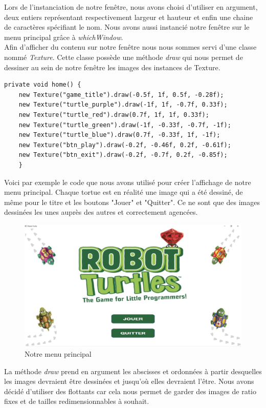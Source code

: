\documentclass{article}
\begin{document}
Lors de l'instanciation de notre fenêtre, nous avons choisi d'utiliser en argument, deux entiers représentant respectivement largeur et hauteur et enfin une chaine de caractères spécifiant le nom. Nous avons aussi instancié notre fenêtre sur le menu principal grâce à \textit{whichWindow}. \\ 

Afin d'afficher du contenu sur notre fenêtre nous nous sommes servi d'une classe nommé \textit{Texture}. Cette classe possède une méthode \textit{draw} qui nous permet de dessiner au sein de notre fenêtre les images des instances de Texture.
	\begin{lstlisting}
private void home() {
	new Texture("game_title").draw(-0.5f, 1f, 0.5f, -0.28f);
	new Texture("turtle_purple").draw(-1f, 1f, -0.7f, 0.33f);
	new Texture("turtle_red").draw(0.7f, 1f, 1f, 0.33f);
	new Texture("turtle_green").draw(-1f, -0.33f, -0.7f, -1f);
	new Texture("turtle_blue").draw(0.7f, -0.33f, 1f, -1f);
	new Texture("btn_play").draw(-0.2f, -0.46f, 0.2f, -0.61f);
	new Texture("btn_exit").draw(-0.2f, -0.7f, 0.2f, -0.85f);
	}
	\end{lstlisting}
	\medbreak
Voici par exemple le code que nous avons utilisé pour créer l'affichage de notre menu principal. Chaque tortue est en réalité une image qui a été dessiné, de même pour le titre et les boutons "Jouer" et "Quitter". Ce ne sont que des images dessinées les unes auprès des autres et correctement agencées.  \\[2cm]

\begin{figure}[h]
\begin{center}
	\includegraphics[scale=0.2]{../img/menu} 
\end{center}
\caption{Notre menu principal}
\end{figure}  
\newpage
\indent La méthode \textit{draw} prend en argument les abscisses et ordonnées à partir desquelles les images devraient être dessinées et jusqu'où elles devraient l'être. Nous avons décidé d'utiliser des flottants car cela nous permet de garder des images de ratio fixes et de tailles redimensionnables à souhait. \\ 
\end{document}
